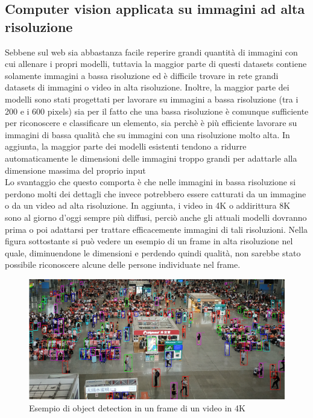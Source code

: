 \subsection{Computer vision applicata su immagini ad alta risoluzione}
Sebbene sul web sia abbastanza facile reperire grandi quantità di immagini con cui allenare i propri modelli, tuttavia la maggior parte di questi datasets contiene solamente immagini a bassa risoluzione ed è difficile trovare in rete grandi datasets di immagini o video in alta risoluzione. Inoltre, la maggior parte dei modelli sono stati progettati per lavorare su immagini a bassa risoluzione (tra i 200 e i 600 pixels) sia per il fatto che una bassa risoluzione è comunque sufficiente per riconoscere e classificare un elemento, sia perchè è più efficiente lavorare su immagini di bassa qualità che su immagini con una risoluzione molto alta\cite{fasthighresolutiondetection}. In aggiunta, la maggior parte dei modelli esistenti tendono a ridurre automaticamente le dimensioni delle immagini troppo grandi per adattarle alla dimensione massima del proprio input\\
Lo svantaggio che questo comporta è che nelle immagini in bassa risoluzione si perdono molti dei dettagli che invece potrebbero essere catturati da un immagine o da un video ad alta risoluzione. In aggiunta, i video in 4K o addirittura 8K sono al giorno d'oggi sempre più diffusi, perciò anche gli attuali modelli dovranno prima o poi adattarsi per trattare efficacemente immagini di tali risoluzioni. Nella figura sottostante si può vedere un esempio di un frame in alta risoluzione nel quale, diminuendone le dimensioni e perdendo quindi qualità, non sarebbe stato possibile riconoscere alcune delle persone individuate nel frame.
\begin{figure}[H]
	\centering
	\includegraphics[width=0.7\linewidth]{images/immagine-4k.jpg}
	\caption{Esempio di object detection in un frame di un video in 4K}
	\label{Esempio di object detection in un frame di un video in 4K}
\end{figure}
